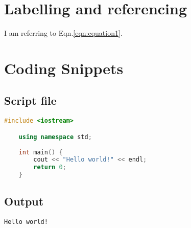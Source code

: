
\section{Labelling and referencing}


I am referring to Eqn.\ref{eqn:equation1}.


\section{Coding Snippets}

\subsection{Script file}
\lstset{style=code_file}

\begin{lstlisting}[language=C++]
    #include <iostream>

    using namespace std;
    
    int main() {
        cout << "Hello world!" << endl;    
        return 0;
    }

\end{lstlisting}

\subsection{Output}
\lstset{style=output}

\begin{lstlisting}
Hello world!
\end{lstlisting}